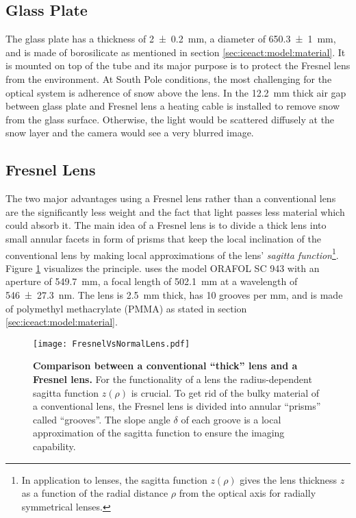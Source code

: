 \subsection{Glass Plate}\label{iceact:model:glassplate}

The \iceact glass plate has a thickness of \SI{2+-0.2}{\milli\meter}, a diameter of \SI{650.3+-1}{\milli\meter}, and is made of borosilicate as mentioned in section \ref{sec:iceact:model:material}. It is mounted on top of the tube and its major purpose is to protect the Fresnel lens from the environment. At South Pole conditions, the most challenging for the optical system is adherence of snow above the lens. In the \SI{12.2}{\milli\meter} thick air gap between glass plate and Fresnel lens a heating cable is installed to remove snow from the glass surface. Otherwise, the light would be scattered diffusely at the snow layer and the camera would see a very blurred image.

\subsection{Fresnel Lens}\label{iceact:model:fresnellens}

The two major advantages using a Fresnel lens rather than a conventional lens are the significantly less weight and the fact that light passes less material which could absorb it. The main idea of a Fresnel lens is to divide a thick lens into small annular facets in form of prisms that keep the local inclination of the conventional lens by making local approximations of the lens' \textit{sagitta function}\footnote{In application to lenses, the sagitta function $z(\rho)$ gives the lens thickness $z$ as a function of the radial distance $\rho$ from the optical axis for radially symmetrical lenses.}. Figure \ref{iceact:model:fresnelvsthick} visualizes the principle. \iceact uses the model ORAFOL SC 943 with an aperture of \SI{549.7}{\milli\meter}, a focal length of \SI{502.1}{\milli\meter} at a wavelength of \SI{546+-27.3}{\nano\meter}. The lens is \SI{2.5}{\milli\meter} thick, has 10 grooves per \si{\milli\meter}, and is made of polymethyl methacrylate (PMMA) as stated in section \ref{sec:iceact:model:material}. \cite{iceact:fresnellens:datasheet}

\begin{figure}[H]
	\centering
	\texttt{[image: FresnelVsNormalLens.pdf]}
	\caption[Comparison conventional vs. Fresnel lens]{\textbf{Comparison between a conventional \enquote{thick} lens and a Fresnel lens.} \cite{famous:eichler} For the functionality of a lens the radius-dependent sagitta function $z(\rho)$ is crucial. To get rid of the bulky material of a conventional lens, the Fresnel lens is divided into annular \enquote{prisms} called \enquote{grooves}. The slope angle $\delta$ of each groove is a local approximation of the sagitta function to ensure the imaging capability.}
	\label{iceact:model:fresnelvsthick}	
\end{figure}

